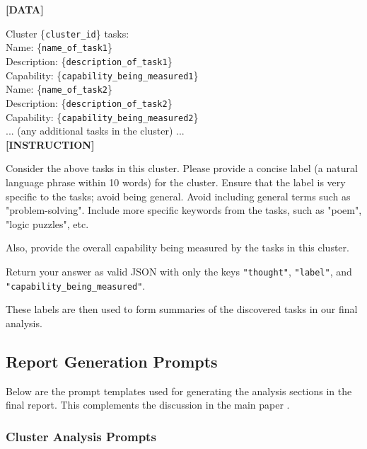 \begin{tcolorbox}[breakable,boxrule=0.5pt,sharp corners,fontupper=\small,
colback=orange!5!white, colframe=orange!80!black, title={Task Cluster Labelling User Prompt}]
\textbf{[DATA]}

Cluster \{\texttt{cluster\_id}\} tasks:\\

Name: \{\texttt{name\_of\_task1}\}  \\
Description: \{\texttt{description\_of\_task1}\}  \\
Capability: \{\texttt{capability\_being\_measured1}\}  \\

Name: \{\texttt{name\_of\_task2}\}  \\
Description: \{\texttt{description\_of\_task2}\}  \\
Capability: \{\texttt{capability\_being\_measured2}\}  \\

... (any additional tasks in the cluster) ...\\

\textbf{[INSTRUCTION]}

Consider the above tasks in this cluster. Please provide a concise label (a natural language phrase within 10 words) for the cluster. Ensure that the label is very specific to the tasks; avoid being general. Avoid including general terms such as "problem-solving". Include more specific keywords from the tasks, such as "poem", "logic puzzles", etc.

Also, provide the overall capability being measured by the tasks in this cluster.

Return your answer as valid JSON with only the keys \texttt{"thought"}, \texttt{"label"}, and \texttt{"capability\_being\_measured"}.
\end{tcolorbox}

These labels are then used to form summaries of the discovered tasks in our final analysis.

\subsection{Report Generation Prompts}
\label{appsubsec:report_prompts}

Below are the prompt templates used for generating the analysis sections in the final report. 
This complements the discussion in the main paper .

\subsubsection{Cluster Analysis Prompts}

